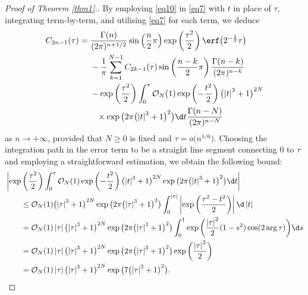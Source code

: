 \begin{proof}[Proof of Theorem \ref{thm1}.] By employing \eqref{eq10} in \eqref{eq7} with $t$ in place of $\tau$, integrating term-by-term, and utilising \eqref{eq7} for each term, we deduce
\begin{align*}
C_{2n - 1} (\tau ) ={}& \frac{\Gamma (n)}{(2\pi )^{n + 1/2} }\sin \left( \frac{n}{2}\pi \right)\exp \left( \frac{\tau ^2}{2} \right)\erf\big( 2^{ - \frac{1}{2}} \tau \big) \\
&- \frac{1}{\pi}\sum_{k = 1}^{N - 1} C_{2k - 1} (\tau )\sin \left( \frac{n - k}{2}\pi \right)\frac{\Gamma (n - k)}{(2\pi )^{n - k} }
\\ & - \exp \left( \frac{\tau ^2}{2} \right)\int_0^\tau \mathcal{O}_N (1)\exp \left( - \frac{t^2}{2} \right)\bigl(\left| t \right|^3 + 1\bigr)^{2N} \\
&\phantom{-}{}\times\exp \big( 2\pi \bigl(\left| t \right|^3 + 1\bigr)^2 \big)\d t \frac{\Gamma (n - N)}{(2\pi )^{n - N}}
\end{align*}
as $n\to+\infty$, provided that $N\ge 0$ is fixed and $\tau = o\big(n^{1/6}\big)$. Choosing the integration path in the error term to be a straight line segment connecting $0$ to $\tau$ and employing a straightforward estimation, we obtain the following bound:
\begin{align*}
& \left| \exp \left( \frac{\tau ^2}{2} \right)\int_0^\tau \mathcal{O}_N (1)\exp \left( - \frac{t^2}{2} \right)\bigl(\left| t \right|^3 + 1\bigr)^{2N} \exp \big( 2\pi \bigl(\left| t \right|^3 + 1\bigr)^2 \big)\d t \right|
\\ &\qquad \le \mathcal{O}_N (1)\bigl(\left| \tau \right|^3 + 1\bigr)^{2N} \exp \big( 2\pi \bigl(\left| \tau \right|^3 + 1\bigr)^2 \big) \int_0^{\left| \tau \right|} \left| \exp \left( \frac{\tau ^2 - t^2}{2} \right) \right|\d\left| t \right|
\\ & \qquad= \mathcal{O}_N (1) \left| \tau \right|\bigl(\left| \tau \right|^3 + 1\bigr)^{2N} \exp \big( 2\pi \bigl(\left| \tau \right|^3 + 1\bigr)^2 \big) \int_0^1 \exp \bigg( \frac{\left| \tau \right|^2}{2}(1 - s^2 )\cos (2\arg \tau ) \bigg)\d s
\\ & \qquad= \mathcal{O}_N (1)\left| \tau \right|\bigl(\left| \tau \right|^3 + 1\bigr)^{2N} \exp \big( 2\pi \bigl(\left| \tau \right|^3 + 1\bigr)^2 \big)\exp \bigg( \frac{\left| \tau \right|^2}{2} \bigg)
\\ & \qquad= \mathcal{O}_N (1)\left| \tau \right|\bigl(\left| \tau \right|^3 + 1\bigr)^{2N} \exp \big( 7\bigl(\left| \tau \right|^3 + 1\bigr)^2 \big).
\end{align*}

\end{proof}

